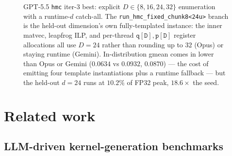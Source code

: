 \documentclass{article}
\theoremstyle{plain}
\theoremstyle{definition}
\theoremstyle{remark}
\begin{document}
\begin{figure}[t]
\centering
{}
\caption{GPT-5.5 \texttt{hmc} iter-3 best: explicit $D{\in}\{8,16,24,32\}$
enumeration with a runtime-$d$ catch-all. The
\texttt{run\_hmc\_fixed\_chunk8<24u>} branch is the held-out
dimension's own fully-templated instance: the inner matvec,
leapfrog ILP, and per-thread $\mathtt{q[D]}, \mathtt{p[D]}$ register
allocations all use $D{=}24$ rather than rounding up to $32$ (Opus)
or staying runtime (Gemini). In-distribution gmean comes in lower
than Opus or Gemini ($0.0634$ vs $0.0932$, $0.0870$) --- the cost of
emitting four template instantiations plus a runtime fallback ---
but the held-out $d{=}24$ runs at $10.2\%$ of FP32 peak,
$18.6\times$ the seed.}
\label{fig:gpt5-hmc-dispatch}
\end{figure}

\section{Related work}
\label{app:related}

\subsection{LLM-driven kernel-generation benchmarks}
\end{document}
